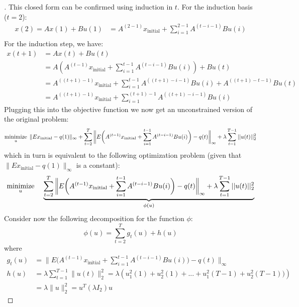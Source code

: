 \documentclass[12pt]{article}
\DeclareMathOperator*{\minimize}{minimize}
\begin{document}
\begin{proof}[\unskip\nopunct]
This closed form can be confirmed using induction in $t$. For the induction basis ($t = 2$):
\vspace{-0.8em}
\begin{align*}
    x(2) = A x(1) + Bu(1) &= A^{(2 - 1)} x_{\text{initial}} + \sum_{i=1}^{2 - 1} A^{(t - i - 1)}Bu(i) \\
\end{align*}
For the induction step, we have:
\vspace{-0.3em}
\begin{align*}
    x(t + 1) &= Ax(t) + Bu(t) \\
    &= A \left(  A^{(t-1)} x_{\text{initial}} + \sum_{i=1}^{t-1} A^{(t - i - 1)}Bu(i) \right) + Bu(t) \\ 
    &=  A^{((t + 1)-1)} x_{\text{initial}} + \sum_{i=1}^{t-1} A^{((t + 1) - i - 1)}Bu(i) + A^{((t + 1) - t - 1)}Bu(t) \\ 
    &= A^{((t + 1)-1)} x_{\text{initial}} + \sum_{i=1}^{(t + 1)-1} A^{((t + 1) - i-1)}Bu(i)
\end{align*}
Plugging this into the objective function we now get an unconstrained version of the original problem:
\vspace{-0.5em}
\begin{align*}
    \minimize_{u} \hspace{0.1cm} \|Ex_{\text{initial}} - q(1)\|_{\infty} +
    \sum_{t=2}^{T} \bigg\|E \bigg(A^{(t-1)} x_{\text{initial}} + \sum_{i=1}^{t-1} A^{(t - i-1)} B u(i)\bigg) - q(t)\bigg\|_{\infty} +
    \lambda \sum_{t=1}^{T-1} ||u(t)||_{2}^2
\end{align*}
which in turn is equivalent to the following optimization problem (given that $\|Ex_{\text{initial}} - q(1)\|_{\infty}$ is a constant):
\begin{align*}
    \minimize_{u} \hspace{0.4cm} \underbrace{
    \sum_{t=2}^{T} \bigg\|E \bigg(A^{(t-1)} x_{\text{initial}} + \sum_{i=1}^{t-1} A^{(t - i-1)} B u(i)\bigg) - q(t)\bigg\|_{\infty} +
    \lambda \sum_{t=1}^{T-1} ||u(t)||_{2}^2}_{\phi(u)}
\end{align*}
Consider now the following decomposition for the function $\phi$:
\[  
    \phi(u) =  \sum_{t=2}^{T} g_t(u) + h(u)
\]
where 
\vspace{-0.5em}
\begin{align*}
    g_t(u) &=  \bigg\|E \bigg(A^{(t-1)} x_{\text{initial}} + \sum_{i=1}^{t-1} A^{(t - i-1)} B u(i)\bigg) - q(t)\bigg\|_{\infty} \\
    h(u) &= \lambda \sum_{t=1}^{T-1} \|u(t)\|_{2}^2 = 
    \lambda \left( u_1^2(1)+ u_2^2(1) + ... + u_1^2(T - 1)+ u_2^2(T - 1))\right) \\
    &=  \lambda \|u\|_2^2 = u^T (\lambda I_2) u
\end{align*}


\end{proof}
\end{document}
